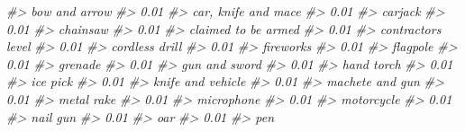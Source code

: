 \documentclass[
]{krantz}
\makeatletter
\newenvironment{Shaded}{\begin{snugshade}}{\end{snugshade}}
\newcommand{\CommentTok}[1]{\textcolor[rgb]{0.37,0.37,0.37}{\textit{#1}}}
\newenvironment{kframe}{%
\medskip{}
\setlength{\fboxsep}{.8em}
 \def\at@end@of@kframe{}%
 \ifinner\ifhmode%
  \def\at@end@of@kframe{\end{minipage}}%
  \begin{minipage}{\columnwidth}%
 \fi\fi%
 \def\FrameCommand##1{\hskip\@totalleftmargin \hskip-\fboxsep
 \colorbox{shadecolor}{##1}\hskip-\fboxsep
     \hskip-\linewidth \hskip-\@totalleftmargin \hskip\columnwidth}%
 \MakeFramed {\advance\hsize-\width
   \@totalleftmargin\z@ \linewidth\hsize
   \@setminipage}}%
 {\par\unskip\endMakeFramed%
 \at@end@of@kframe}
\renewenvironment{Shaded}{\begin{kframe}}{\end{kframe}}
\makeatother
\begin{document}
\begin{Shaded}
\begin{Highlighting}[]
\CommentTok{\#\textgreater{}                    bow and arrow }
\CommentTok{\#\textgreater{}                             0.01 }
\CommentTok{\#\textgreater{}              car, knife and mace }
\CommentTok{\#\textgreater{}                             0.01 }
\CommentTok{\#\textgreater{}                          carjack }
\CommentTok{\#\textgreater{}                             0.01 }
\CommentTok{\#\textgreater{}                         chainsaw }
\CommentTok{\#\textgreater{}                             0.01 }
\CommentTok{\#\textgreater{}              claimed to be armed }
\CommentTok{\#\textgreater{}                             0.01 }
\CommentTok{\#\textgreater{}               contractor\textquotesingle{}s level }
\CommentTok{\#\textgreater{}                             0.01 }
\CommentTok{\#\textgreater{}                   cordless drill }
\CommentTok{\#\textgreater{}                             0.01 }
\CommentTok{\#\textgreater{}                        fireworks }
\CommentTok{\#\textgreater{}                             0.01 }
\CommentTok{\#\textgreater{}                         flagpole }
\CommentTok{\#\textgreater{}                             0.01 }
\CommentTok{\#\textgreater{}                          grenade }
\CommentTok{\#\textgreater{}                             0.01 }
\CommentTok{\#\textgreater{}                    gun and sword }
\CommentTok{\#\textgreater{}                             0.01 }
\CommentTok{\#\textgreater{}                       hand torch }
\CommentTok{\#\textgreater{}                             0.01 }
\CommentTok{\#\textgreater{}                         ice pick }
\CommentTok{\#\textgreater{}                             0.01 }
\CommentTok{\#\textgreater{}                knife and vehicle }
\CommentTok{\#\textgreater{}                             0.01 }
\CommentTok{\#\textgreater{}                  machete and gun }
\CommentTok{\#\textgreater{}                             0.01 }
\CommentTok{\#\textgreater{}                       metal rake }
\CommentTok{\#\textgreater{}                             0.01 }
\CommentTok{\#\textgreater{}                       microphone }
\CommentTok{\#\textgreater{}                             0.01 }
\CommentTok{\#\textgreater{}                       motorcycle }
\CommentTok{\#\textgreater{}                             0.01 }
\CommentTok{\#\textgreater{}                         nail gun }
\CommentTok{\#\textgreater{}                             0.01 }
\CommentTok{\#\textgreater{}                              oar }
\CommentTok{\#\textgreater{}                             0.01 }
\CommentTok{\#\textgreater{}                              pen }

\end{Highlighting}
\end{Shaded}
\end{document}
